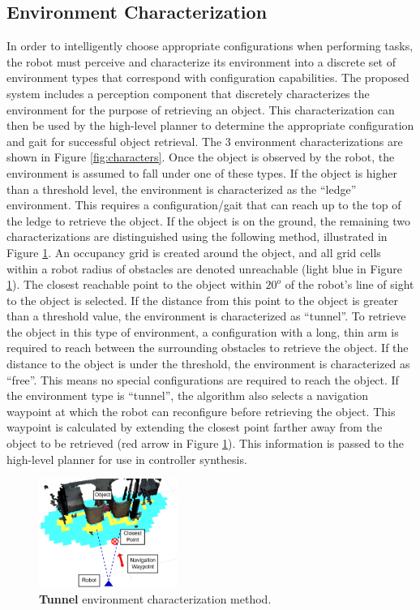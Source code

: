 \documentclass[conference]{IEEEtran}
\begin{document}
\subsection{Environment Characterization}
\label{sec:environment-characterization}
%
In order to intelligently choose appropriate configurations when performing tasks, the robot must perceive and characterize its environment into a discrete set of environment types that correspond with configuration capabilities. The proposed system includes a perception component that discretely characterizes the environment for the purpose of retrieving an object. This characterization can then be used by the high-level planner to determine the appropriate configuration and gait for successful object retrieval. The 3 environment characterizations are shown in Figure \ref{fig:characters}. Once the object is observed by the robot, the environment is assumed to fall under one of these types. If the object is higher than a threshold level, the environment is characterized as the ``ledge'' environment. This requires a configuration/gait that can reach up to the top of the ledge to retrieve the object. If the object is on the ground, the remaining two characterizations are distinguished using the following method, illustrated in Figure \ref{fig:characterization}. An occupancy grid is created around the object, and all grid cells within a robot radius of obstacles are denoted unreachable (light blue in Figure \ref{fig:characterization}). The closest reachable point to the object within $20^o$ of the robot's line of sight to the object is selected. If the distance from this point to the object is greater than a threshold value, the environment is characterized as ``tunnel''. To retrieve the object in this type of environment, a configuration with a long, thin arm is required to reach between the surrounding obstacles to retrieve the object. If the distance to the object is under the threshold, the environment is characterized as ``free''. This means no special configurations are required to reach the object. If the environment type is ``tunnel'', the algorithm also selects a navigation waypoint at which the robot can reconfigure before retrieving the object. This waypoint is calculated by extending the closest point farther away from the object to be retrieved (red arrow in Figure \ref{fig:characterization}). This information is passed to the high-level planner for use in controller synthesis.

\begin{figure}
\begin{center}
\includegraphics[width=0.4\textwidth]{images/characterization.png}
\caption{\textbf{Tunnel} environment characterization method.}
\label{fig:characterization}
\end{center}
\end{figure}
\end{document}
